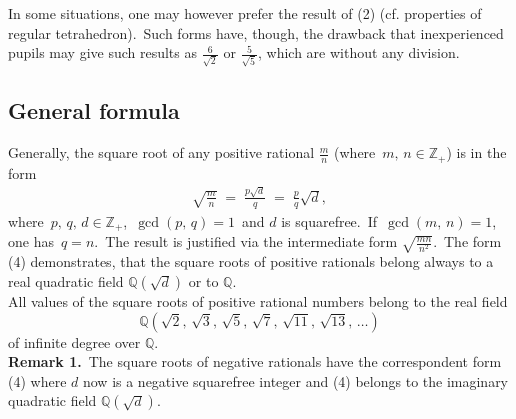 \documentclass[12pt]{article}
\theoremstyle{definition}
\begin{document}
In some situations, one may however prefer the result of (2) (cf. properties of regular tetrahedron).\, Such forms have, though, the drawback that inexperienced pupils may give such results as $\frac{6}{\sqrt{2}}$ or  $\frac{5}{\sqrt{5}}$, which are  without any division. \\

\subsection{General formula}
Generally, the square root of any positive rational $\frac{m}{n}$ (where\, $m,\,n \in \mathbb{Z}_+$) is  in the form
\begin{align}
\sqrt{\frac{m}{n}} \;=\; \frac{p\sqrt{d}}{q} \;=\; \frac{p}{q}\sqrt{d},
\end{align}
where\, $p,\,q,\,d \in \mathbb{Z}_+$,\, $\gcd(p,\,q) = 1$\, and $d$ is squarefree.\, If\, $\gcd(m,\,n) = 1$,\, one has\, $q = n$.\, The result is justified via the intermediate form $\displaystyle\sqrt{\frac{mn}{n^2}}$.\,  The form (4) demonstrates, that the square roots of positive rationals belong always to a real quadratic field 
$\mathbb{Q}(\sqrt{d})$ or to $\mathbb{Q}$.\\

All values of the square roots of positive rational numbers belong to the real field 
$$\mathbb{Q}(\sqrt{2},\,\sqrt{3},\,\sqrt{5},\,\sqrt{7},\,\sqrt{11},\,\sqrt{13},\,\ldots)$$
of infinite degree over $\mathbb{Q}$.\\

\textbf{Remark 1.}\, The square roots of negative rationals have the correspondent form (4)
where $d$ now is a negative squarefree integer and (4) belongs to the imaginary quadratic field $\mathbb{Q}(\sqrt{d})$.


\end{document}
